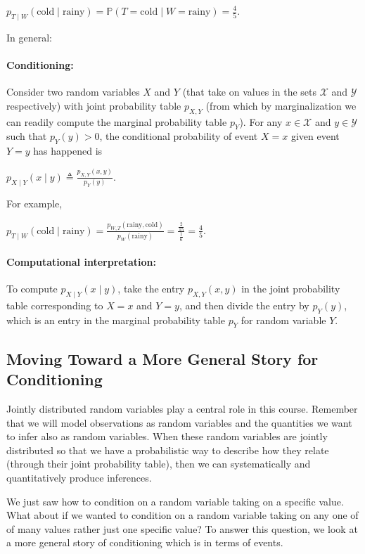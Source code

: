 \documentclass[6008notes.tex]{subfiles}
\begin{document}
$p_{T\mid W}(\text {cold}\mid \text {rainy})=\mathbb {P}(T=\text {cold}\mid W=\text {rainy})=\frac{4}{5}.$
 
In general:

\paragraph{Conditioning:} Consider two random variables $X$ and $Y$ (that take on values in the sets $\mathcal{X}$ and $\mathcal{Y}$ respectively) with joint probability table $p_{X,Y}$ (from which by marginalization we can readily compute the marginal probability table $p_Y$). For any $x\in \mathcal{X}$ and $y\in \mathcal{Y}$ such that $p_{Y}(y)>0$, the conditional probability of event $X=x$ given event $Y=y$ has happened is

$p_{X\mid Y}(x\mid y)\triangleq \frac{p_{X,Y}(x,y)}{p_{Y}(y)}.$
 
For example,

$p_{T\mid W}(\text {cold}\mid \text {rainy})=\frac{p_{W,T}(\text {rainy},\text {cold})}{p_{W}(\text {rainy})}=\frac{\frac{2}{15}}{\frac{1}{6}}=\frac{4}{5}.$
 
\paragraph{Computational interpretation:} To compute $p_{X\mid Y}(x\mid y)$, take the entry $p_{X,Y}(x,y)$ in the joint probability table corresponding to $X=x$ and $Y=y$, and then divide the entry by $p_Y(y)$, which is an entry in the marginal probability table $p_Y$ for random variable $Y$.

\subsection{Moving Toward a More General Story for Conditioning}

Jointly distributed random variables play a central role in this course. Remember that we will model observations as random variables and the quantities we want to infer also as random variables. When these random variables are jointly distributed so that we have a probabilistic way to describe how they relate (through their joint probability table), then we can systematically and quantitatively produce inferences.

We just saw how to condition on a random variable taking on a specific value. What about if we wanted to condition on a random variable taking on any one of of many values rather just one specific value? To answer this question, we look at a more general story of conditioning which is in terms of events.
\end{document}
